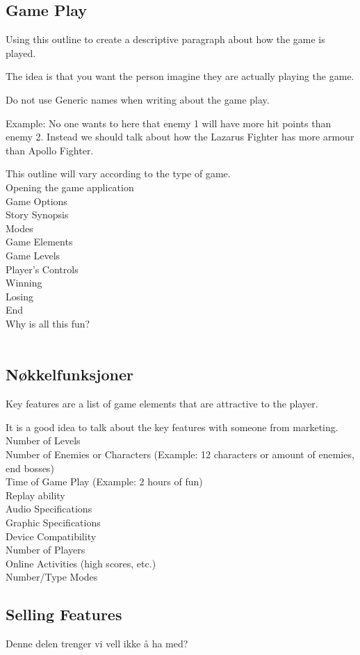 \subsection{Game Play}

Using this outline to create a descriptive paragraph about how the game is played. 

The idea is that you want the person imagine they are actually playing the game.

Do not use Generic names when writing about the game play. 

Example: No one wants to here that enemy 1 will have more hit points than enemy 2. Instead we should talk about how the Lazarus Fighter has more armour than Apollo Fighter.

This outline will vary according to the type of game. \\
Opening the game application\\
Game Options \\
Story Synopsis\\
Modes\\
Game Elements\\
Game Levels\\
Player’s Controls\\
Winning\\
Losing\\
End\\
Why is all this fun?\\
\\

\subsection{Nøkkelfunksjoner}

Key features are a list of game elements that are attractive to the player.

It is a good idea to talk about the key features with someone from marketing.\\
Number of Levels\\
Number of Enemies or Characters (Example: 12 characters or amount of enemies, end bosses)\\
Time of Game Play (Example: 2 hours of fun)\\
Replay ability \\
Audio Specifications\\
Graphic Specifications\\
Device Compatibility\\
Number of Players\\
Online Activities (high scores, etc.)\\
Number/Type Modes

\subsection{Selling Features}

Denne delen trenger vi vell ikke å ha med?







